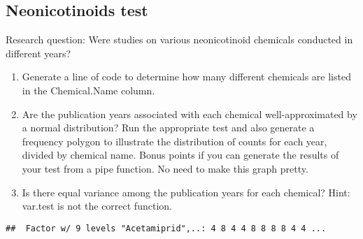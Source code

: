 \documentclass[]{article}
\newenvironment{Shaded}{\begin{snugshade}}{\end{snugshade}}
\newcommand{\KeywordTok}[1]{\textcolor[rgb]{0.13,0.29,0.53}{\textbf{#1}}}
\newcommand{\StringTok}[1]{\textcolor[rgb]{0.31,0.60,0.02}{#1}}
\newcommand{\CommentTok}[1]{\textcolor[rgb]{0.56,0.35,0.01}{\textit{#1}}}
\newcommand{\OperatorTok}[1]{\textcolor[rgb]{0.81,0.36,0.00}{\textbf{#1}}}
\newcommand{\NormalTok}[1]{#1}
\begin{document}
\subsection{Neonicotinoids test}\label{neonicotinoids-test}

Research question: Were studies on various neonicotinoid chemicals
conducted in different years?

\begin{enumerate}
\def\labelenumi{\arabic{enumi}.}
\setcounter{enumi}{2}
\item
  Generate a line of code to determine how many different chemicals are
  listed in the Chemical.Name column.
\item
  Are the publication years associated with each chemical
  well-approximated by a normal distribution? Run the appropriate test
  and also generate a frequency polygon to illustrate the distribution
  of counts for each year, divided by chemical name. Bonus points if you
  can generate the results of your test from a pipe function. No need to
  make this graph pretty.
\item
  Is there equal variance among the publication years for each chemical?
  Hint: var.test is not the correct function.
\end{enumerate}

\begin{Shaded}
\end{Shaded}

\begin{verbatim}
##  Factor w/ 9 levels "Acetamiprid",..: 4 8 4 4 8 8 8 8 4 4 ...
\end{verbatim}

\begin{Shaded}
\end{Shaded}
\end{document}
